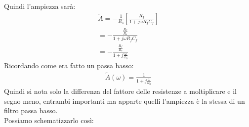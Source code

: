 \documentclass[a4paper, oneside]{article}
\begin{document}
Quindi l'ampiezza sarà:
\begin{gather*}
    \widetilde{A} = - \frac{1}{R_s} \left[ \frac{R_f}{1 + j \omega R_f C_f} \right]\\
     = - \frac{\frac{R_f}{R_s}}{1 + j \omega R_f C_f}\\
      = - \frac{\frac{R_f}{R_s}}{1 + j \frac{\omega}{\omega_0}} 
\end{gather*}
Ricordando come era fatto un passa basso:
\begin{gather*}
    \widetilde{A} (\omega) = \frac{1}{ 1 + j\frac{\omega}{\omega_0}}
\end{gather*}
Quindi si nota solo la differenza del fattore delle resistenze a moltiplicare e il segno meno, entrambi importanti ma apparte quelli l'ampiezza è la stessa di un filtro passa basso.\\
Possiamo schematizzarlo così:
\end{document}
